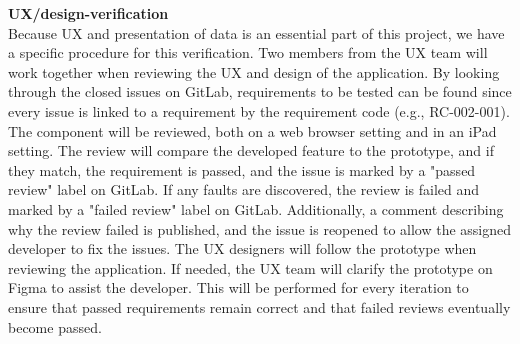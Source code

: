 \noindent \textbf{UX/design-verification}\\
Because UX and presentation of data is an essential part of this project, we have a specific procedure for this verification. Two members from the UX team will work together when reviewing the UX and design of the application. By looking through the closed issues on GitLab, requirements to be tested can be found since every issue is linked to a requirement by the requirement code (e.g., RC-002-001). The component will be reviewed, both on a web browser setting and in an iPad setting. The review will compare the developed feature to the prototype, and if they match, the requirement is passed, and the issue is marked by a "passed review" label on GitLab. If any faults are discovered, the review is failed and marked by a "failed review" label on GitLab. Additionally, a comment describing why the review failed is published, and the issue is reopened to allow the assigned developer to fix the issues. The UX designers will follow the prototype when reviewing the application. If needed, the UX team will clarify the prototype on Figma to assist the developer. This will be performed for every iteration to ensure that passed requirements remain correct and that failed reviews eventually become passed. \\ \\


